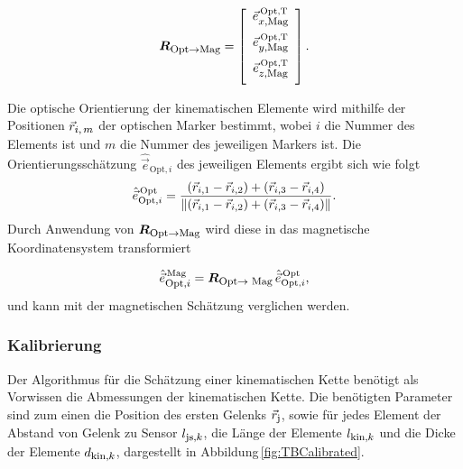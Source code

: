 \begin{equation}
    \bvec{R}\tindex{Opt${\rightarrow}$Mag} = \left[\begin{array}{c} \vspace{0.2cm} \vec{e}\tindex{$x$,Mag}^\text{\,Opt,T} \\ \vspace{0.2cm}\vec{e}\tindex{$y$,Mag}^\text{\,Opt,T} \\ \vspace{0.2cm}\vec{e}\tindex{$z$,Mag}^\text{\,Opt,T} \end{array}\right].
    \label{eq:CoordinateTrans}
\end{equation}

Die optische Orientierung der kinematischen Elemente wird mithilfe der Positionen $\vec{r}_{\textrm{\footnotesize{$i,m$}}}$ der optischen Marker bestimmt, wobei $i$ die Nummer des Elements ist und $m$ die Nummer des jeweiligen Markers ist. Die Orientierungsschätzung $\hat{\vec{e}}_{\text{Opt},i}$ des jeweiligen Elements ergibt sich wie folgt
\begin{equation}
    \hat{\vec{e}}_{\text{Opt},i}^\text{\,Opt} = \frac{(\vec{r}_{i,1} - \vec{r}_{i,2}) + (\vec{r}_{i,3} - \vec{r}_{i,4}) }{ \|(\vec{r}_{i,1} - \vec{r}_{i,2}) + (\vec{r}_{i,3} - \vec{r}_{i,4})\|  }.
\end{equation}
Durch Anwendung von $\mbox{\boldmath ${R}$}_{\textrm{\footnotesize{Opt$\rightarrow$Mag}}}$ wird diese in das magnetische Koordinatensystem transformiert

\begin{equation}
    \hat{\vec{e}}_{\textrm{\footnotesize{Opt,$i$}}}^\text{\,Mag} =  \mbox{\boldmath ${R}$}_{\textrm{\footnotesize{Opt$\rightarrow$ Mag}}}\,\hat{\vec{e}}_{\text{Opt},i}^\text{\,Opt},
\end{equation}
und kann mit der magnetischen Schätzung verglichen werden.


\subsubsection{Kalibrierung}
Der Algorithmus für die Schätzung einer kinematischen Kette benötigt als Vorwissen die Abmessungen der kinematischen Kette. Die benötigten Parameter sind zum einen die Position des ersten Gelenks $\vec{r}_{\textrm{\footnotesize{j}}}$, sowie für jedes Element der Abstand von Gelenk zu Sensor $l_{\textrm{\footnotesize{js,$k$}}}$, die Länge der Elemente $l_{\textrm{\footnotesize{kin,$k$}}}$ und die Dicke der Elemente $d_{\textrm{\footnotesize{kin,$k$}}}$, dargestellt in Abbildung\,\ref{fig:TBCalibrated}.

